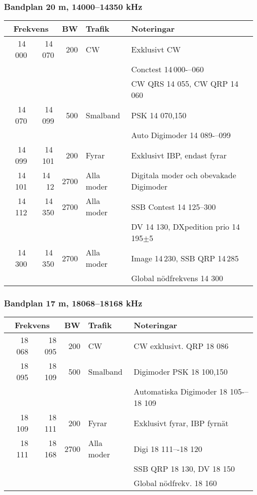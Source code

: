 \begin{landscape}
\subsubsection{Bandplan 20 m, 14000--14350 kHz}
\begin{tabular}{rrrll}
\multicolumn{2}{c}{\textbf{Frekvens}} & \textbf{BW} & \textbf{Trafik} & \textbf{Noteringar} \\ \hline
14\,000 & 14\,070 & 200  & CW         & Exklusivt CW                            \\
       &        &      &            & Conctest 14\,000-–060                     \\
       &        &      &            & CW QRS 14 055, CW QRP 14\,060            \\ \hline
14\,070 & 14\,099 & 500  & Smalband   & PSK 14 070,150                          \\
       &        &      &            & Auto Digimoder 14 089-–099              \\ \hline
14\,099 & 14\,101 & 200  & Fyrar      & Exklusivt IBP, endast fyrar             \\ \hline
14\,101 & 14 \,12 & 2700 & Alla moder & Digitala moder och obevakade Digimoder  \\ \hline
14\,112 & 14\,350 & 2700 & Alla moder & SSB Contest 14 125--300                 \\
       &        &      &            & DV 14 130, DXpedition prio 14\,195$\pm$5 \\ \hline
14\,300 & 14\,350 & 2700 & Alla moder & Image 14\,230, SSB QRP 14\,285            \\
       &        &      &            & Global nödfrekvens 14 300               \\ \hline
\end{tabular}

\subsubsection{Bandplan 17 m, 18068--18168 kHz}
\begin{tabular}{rrrll}
\multicolumn{2}{c}{\textbf{Frekvens}} & \textbf{BW} & \textbf{Trafik} & \textbf{Noteringar} \\ \hline
18 068 & 18 095 & 200  & CW         & CW exklusivt. QRP 18 086             \\ \hline
18 095 & 18 109 & 500  & Smalband   & Digimoder PSK 18 100,150             \\
       &        &      &            & Automatiska Digimoder 18 105-–18 109 \\ \hline
18 109 & 18 111 & 200  & Fyrar      & Exklusivt fyrar, IBP fyrnät          \\ \hline
18 111 & 18 168 & 2700 & Alla moder & Digi 18 111–-18 120                  \\
       &        &      &            & SSB QRP 18 130, DV 18 150            \\
       &        &      &            & Global nödfrekv. 18 160\\ \hline
\end{tabular}


\end{landscape}

